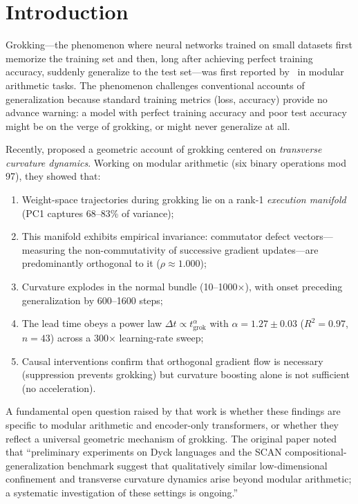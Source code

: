 \documentclass[11pt]{article}
\newcommand{\grokstep}{t_{\text{grok}}}
\newcommand{\leadtime}{\Delta t}
\begin{document}
\section{Introduction}
\label{sec:intro}

Grokking---the phenomenon where neural networks trained on small datasets first memorize the training set and then, long after achieving perfect training accuracy, suddenly generalize to the test set---was first reported by~\citet{power2022grokking} in modular arithmetic tasks. The phenomenon challenges conventional accounts of generalization because standard training metrics (loss, accuracy) provide no advance warning: a model with perfect training accuracy and poor test accuracy might be on the verge of grokking, or might never generalize at all.

Recently, \citet{xu2026integrability} proposed a geometric account of grokking centered on \emph{transverse curvature dynamics}. Working on modular arithmetic (six binary operations mod 97), they showed that:
\begin{enumerate}
  \item Weight-space trajectories during grokking lie on a rank-1 \emph{execution manifold} (PC1 captures 68--83\% of variance);
  \item This manifold exhibits empirical invariance: commutator defect vectors---measuring the non-commutativity of successive gradient updates---are predominantly orthogonal to it ($\rho \approx 1.000$);
  \item Curvature explodes in the normal bundle (10--1000$\times$), with onset preceding generalization by 600--1600 steps;
  \item The lead time obeys a power law $\leadtime \propto \grokstep^\alpha$ with $\alpha = 1.27 \pm 0.03$ ($R^2 = 0.97$, $n = 43$) across a 300$\times$ learning-rate sweep;
  \item Causal interventions confirm that orthogonal gradient flow is necessary (suppression prevents grokking) but curvature boosting alone is not sufficient (no acceleration).
\end{enumerate}
A fundamental open question raised by that work is whether these findings are specific to modular arithmetic and encoder-only transformers, or whether they reflect a universal geometric mechanism of grokking. The original paper noted that ``preliminary experiments on Dyck languages and the SCAN compositional-generalization benchmark suggest that qualitatively similar low-dimensional confinement and transverse curvature dynamics arise beyond modular arithmetic; a systematic investigation of these settings is ongoing.''
\end{document}
